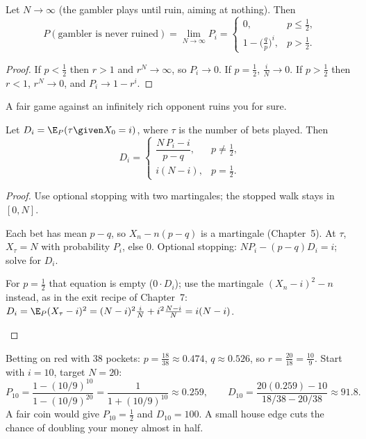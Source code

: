 \begin{result}
\label{res:ruin-limit}
Let $N\to\infty$ (the gambler plays until ruin, aiming at nothing). Then
\[
  P(\text{gambler is never ruined})=\lim_{N\to\infty}P_i=\begin{cases}0,&p\le\frac12,\\ 1-\big(\frac qp\big)^i,&p>\frac12.\end{cases}
\]
\end{result}
\begin{proof}
If $p<\frac12$ then $r>1$ and $r^N\to\infty$, so $P_i\to0$. If $p=\frac12$, $\frac iN\to0$. If $p>\frac12$ then $r<1$, $r^N\to0$, and $P_i\to1-r^i$.
\end{proof}

A fair game against an infinitely rich opponent ruins you for sure.

\begin{result}
\label{res:duration}
Let $D_i=\E_P(\tau\given X_0=i)$, where $\tau$ is the number of bets played. Then
\[
  D_i=\begin{cases}\dfrac{N\,P_i-i}{p-q},&p\ne\frac12,\\[2ex] i(N-i),&p=\frac12.\end{cases}
\]
\end{result}
\begin{proof}
Use optional stopping with two martingales; the stopped walk stays in $[0,N]$.
\begin{steps}
  \item Each bet has mean $p-q$, so $X_n-n(p-q)$ is a martingale (Chapter~5). At $\tau$, $X_\tau=N$ with probability $P_i$, else $0$. Optional stopping: $N P_i-(p-q)D_i=i$; solve for $D_i$.
  \item For $p=\frac12$ that equation is empty ($0\cdot D_i$); use the martingale $(X_n-i)^2-n$ instead, as in the exit recipe of Chapter~7: $D_i=\E_P(X_\tau-i)^2=(N-i)^2\frac iN+i^2\frac{N-i}{N}=i(N-i)$. \qedhere
\end{steps}
\end{proof}

\begin{example}[Roulette]
\label{ex:roulette}
Betting on red with 38 pockets: $p=\frac{18}{38}\approx0.474$, $q\approx0.526$, so $r=\frac{20}{18}=\frac{10}{9}$. Start with $i=10$, target $N=20$:
\[
  P_{10}=\frac{1-(10/9)^{10}}{1-(10/9)^{20}}=\frac{1}{1+(10/9)^{10}}\approx0.259,\qquad
  D_{10}=\frac{20(0.259)-10}{18/38-20/38}\approx91.8 .
\]
A fair coin would give $P_{10}=\frac12$ and $D_{10}=100$. A small house edge cuts the chance of doubling your money almost in half.
\end{example}


